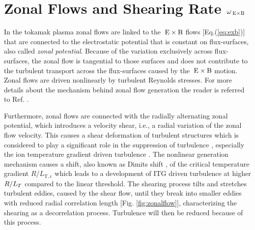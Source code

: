\section{Zonal Flows and Shearing Rate $\omega_{\mathrm{\:E \times B}}$}
\label{sec:zonalflow}

In the tokamak plasma zonal flows are linked to the $\mathrm{\:E}\times\mathrm{B}$ flows [Eq.(\ref{eq:exb})] that are connected to the electrostatic potential that is constant on flux-surfaces, also called \textit{zonal potential}. \cite{Diamond2005} Because of the variation exclusively across flux-surfaces, the zonal flow is tangential to those surfaces and does not contribute to the turbulent transport across the flux-surfaces caused by the $\mathrm{\:E}\times\mathrm{B}$ motion. 
Zonal flows are driven nonlinearly by turbulent Reynolds stresses. \cite{Diamond1991} For more details about the mechanism behind zonal flow generation the reader is referred to Ref. . \bigskip


Furthermore, zonal flows are connected with the radially alternating zonal potential, which introduces a velocity shear, i.e., a radial variation of the zonal flow velocity. This causes a shear deformation of turbulent structures which is considered to play a significant role in the suppression of turbulence \cite{Biglari1990, Dimits2000}, especially the ion temperature gradient driven turbulence \cite{Nakata2012, Makwana2014, Maeyama2014, Whelan2018, Whelan2019}. The nonlinear generation mechanism causes a shift, also known as Dimits shift \cite{Dimits2000}, of the critical temperature gradient $R/L_\mathrm{T,c}$ which leads to a development of ITG driven turbulence at higher $R/L_T$ compared to the linear threshold. The shearing process tilts and stretches turbulent eddies, caused by the shear flow, until they break into smaller eddies with reduced radial correlation length [Fig. \ref{fig:zonalflow}],  characterizing the shearing as a decorrelation process. Turbulence will then be reduced because of this process. \cite{Biglari1990,Diamond2005,Burnell1997} \bigskip

\newpage

